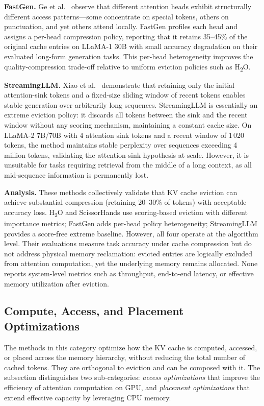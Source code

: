 \documentclass[
english,                 %
bibtex,                  %
]{kththesis}
\numberwithin{listing}{chapter}
\begin{document}
\textbf{FastGen.} Ge et al.~\cite{ge2024model} observe that different attention heads exhibit structurally different access patterns---some concentrate on special tokens, others on punctuation, and yet others attend locally. FastGen profiles each head and assigns a per-head compression policy, reporting that it retains 35--45\% of the original cache entries on LLaMA-1 30B with small accuracy degradation on their evaluated long-form generation tasks. This per-head heterogeneity improves the quality-compression trade-off relative to uniform eviction policies such as H\textsubscript{2}O.

\textbf{StreamingLLM.} Xiao et al.~\cite{xiao2024efficient} demonstrate that retaining only the initial attention-sink tokens and a fixed-size sliding window of recent tokens enables stable generation over arbitrarily long sequences. StreamingLLM is essentially an extreme eviction policy: it discards all tokens between the sink and the recent window without any scoring mechanism, maintaining a constant cache size. On LLaMA-2 7B/70B with 4 attention sink tokens and a recent window of 1\,020 tokens, the method maintains stable perplexity over sequences exceeding 4 million tokens, validating the attention-sink hypothesis at scale. However, it is unsuitable for tasks requiring retrieval from the middle of a long context, as all mid-sequence information is permanently lost.

\textbf{Analysis.} These methods collectively validate that \gls{KV} cache eviction can achieve substantial compression (retaining 20--30\% of tokens) with acceptable accuracy loss. H\textsubscript{2}O and ScissorHands use scoring-based eviction with different importance metrics; FastGen adds per-head policy heterogeneity; StreamingLLM provides a score-free extreme baseline. However, all four operate at the algorithm level. Their evaluations measure task accuracy under cache compression but do not address physical memory reclamation: evicted entries are logically excluded from attention computation, yet the underlying memory remains allocated. None reports system-level metrics such as throughput, end-to-end latency, or effective memory utilization after eviction.

\subsection{Compute, Access, and Placement Optimizations}
\label{sec:bg-compute-access}

The methods in this category optimize how the \gls{KV} cache is computed, accessed, or placed across the memory hierarchy, without reducing the total number of cached tokens. They are orthogonal to eviction and can be composed with it. The subsection distinguishes two sub-categories: \textit{access optimizations} that improve the efficiency of attention computation on \gls{GPU}, and \textit{placement optimizations} that extend effective capacity by leveraging \gls{CPU} memory.
\end{document}
